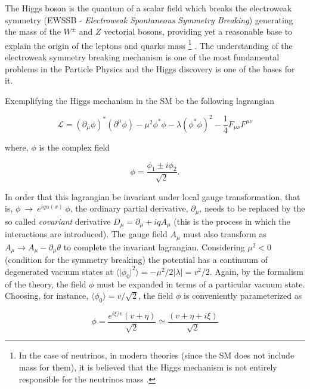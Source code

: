 The Higgs boson is the quantum of a scalar field which breaks the electroweak symmetry (EWSSB - \textit{Electroweak Spontaneous Symmetry Breaking}) generating the mass of the $W^{\pm}$ and $Z$ vectorial bosons, providing yet a reasonable base to explain the origin of the leptons and quarks mass \footnote{In the case of neutrinos, in modern theories (since the SM does not include mass for them), it is believed that the Higgs mechanism is not entirely responsible for the neutrinos mass \cite{bib:PhysRevD-86-1-2012}.} \cite{bib:JPhys-447-1-2013}. The understanding of the electroweak symmetry breaking mechanism is one of the most fundamental problems in the Particle Physics and the Higgs discovery is one of the bases for it. 

Exemplifying the Higgs mechanism in the SM be the following lagrangian

\begin{equation}
\mathcal{L} = (\partial_{\mu}\phi)^{*}(\partial^{\mu}\phi) - \mu^2 \phi^{*}\phi - \lambda(\phi^{*}\phi)^2 - \dfrac{1}{4}F_{\mu\nu}F^{\mu\nu}
\label{eq:Lagrangiana_U1}
\end{equation} 

where, $\phi$ is the complex field

\begin{equation}
\phi = \dfrac{\phi_1 \pm i\phi_2}{\sqrt{2}}.
\end{equation}

In order that this lagrangian be invariant under local gauge transformation, that is, $\phi~\rightarrow~e^{iq\alpha(x)}~\phi$, the ordinary partial derivative, $\partial_{\mu}$, needs to be replaced by the so called \textit{covariant} derivative $D_{\mu} = \partial_{\mu} + iqA_{\mu}$ (this is the process in which the interactions are introduced). The gauge field $A_{\mu}$ must also transform as $A_{\mu} \rightarrow A_{\mu} - \partial_{\mu}\theta$ to complete the invariant lagrangian. Considering $\mu^2 < 0$ (condition for the symmetry breaking) the potential has a continuum of degenerated vacuum states at $\langle \vert \phi_0 \vert^2 \rangle = -\mu^2/2\vert \lambda \vert = v^2/2$. Again, by the formalism of the theory, the field $\phi$ must be expanded in terms of a particular vacuum state. Choosing, for instance, $\langle \phi_0 \rangle = v/\sqrt{2}$, the field $\phi$ is conveniently parameterized as

\begin{equation}
\phi = \dfrac{e^{i\xi /v}(v + \eta)}{\sqrt{2}} \simeq \dfrac{(v + \eta + i\xi)}{\sqrt{2}}
\label{eq:phi_SSB}
\end{equation}

